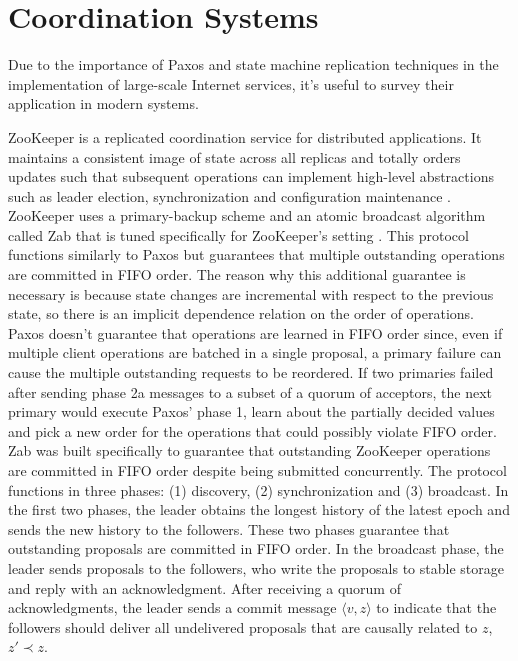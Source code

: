 \section{Coordination Systems} \label{Coordination Systems}
Due to the importance of Paxos and state machine replication techniques in the implementation of large-scale Internet services, it's useful to survey their application in modern systems.\par
ZooKeeper is a replicated coordination service for distributed applications. It maintains a consistent image of state across all replicas and totally orders updates such that subsequent operations can implement high-level abstractions such as leader election, synchronization and configuration maintenance \cite{Hunt2010}. ZooKeeper uses a primary-backup scheme and an atomic broadcast algorithm called Zab that is tuned specifically for ZooKeeper's setting \cite{Junqueira2011}. This protocol functions similarly to Paxos but guarantees that multiple outstanding operations are committed in FIFO order. The reason why this additional guarantee is necessary is because state changes are incremental with respect to the previous state, so there is an implicit dependence relation on the order of operations. Paxos doesn't guarantee that operations are learned in 	FIFO order since, even if multiple client operations are batched in a single proposal, a primary failure can cause the multiple outstanding requests to be reordered. If two primaries failed after sending phase 2a messages to a subset of a quorum of acceptors, the next primary would execute Paxos' phase 1, learn about the partially decided values and pick a new order for the operations that could possibly violate FIFO order. Zab was built specifically to guarantee that outstanding ZooKeeper operations are committed in FIFO order despite being submitted concurrently. The protocol functions in three phases: (1) discovery, (2) synchronization and (3) broadcast. In the  first two phases, the leader obtains the longest history of the latest epoch and sends the new history to the followers. These two phases guarantee that outstanding proposals are committed in FIFO order. In the broadcast phase, the leader sends proposals to the followers, who write the proposals to stable storage and reply with an acknowledgment. After receiving a quorum of acknowledgments, the leader sends a commit message $\langle v,z \rangle$ to indicate that the followers should deliver all undelivered proposals that are causally related to $z$, $z' \prec z$. \par
